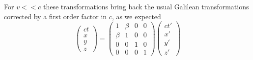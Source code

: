 \documentclass[../admech.tex]{subfiles}
\begin{document}
For $v<<c$ these transformations bring back the usual Galilean transformations corrected by a first order factor in $c$, as we expected
\begin{equation}
	\begin{pmatrix}
		ct\\x\\y\\z
	\end{pmatrix}=\begin{pmatrix}
		1&\beta&0&0\\
		\beta&1&0&0\\
		0&0&1&0\\
		0&0&0&1
	\end{pmatrix}
	\begin{pmatrix}
		ct'\\x'\\y'\\z'
	\end{pmatrix}
	\label{eq:approxlor}
\end{equation}
\end{document}
